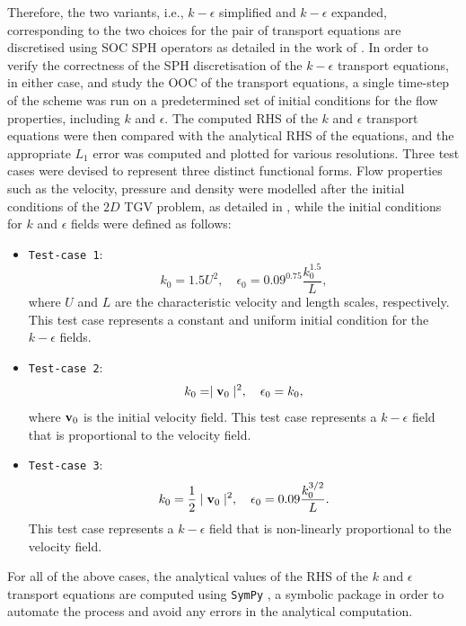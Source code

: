 Therefore, the two variants, i.e., $k-\epsilon$ simplified and $k-\epsilon$ expanded, corresponding to the two choices for the pair of transport equations are discretised using SOC SPH operators as detailed in the work of \cite{Negi2022Techniques}.
In order to verify the correctness of the SPH discretisation of the $k-\epsilon$ transport equations, in either case, and study the OOC of the transport equations, a single time-step of the scheme was run on a predetermined set of initial conditions for the flow properties, including $k$ and $\epsilon$. The computed RHS of the $k$ and $\epsilon$ transport equations were then compared with the analytical RHS of the equations, and the appropriate $L_1$ error was computed and plotted for various resolutions.
Three test cases were devised to represent three distinct functional forms. Flow properties such as the velocity, pressure and density were modelled after the initial conditions of the $2D$ TGV problem, as detailed in , while the initial conditions for $k$ and $\epsilon$ fields were defined as follows:
\begin{itemize}
  \item \texttt{Test-case 1}:
  \begin{equation}
    k_0 = 1.5 U^2, \quad \epsilon_0 = 0.09^{0.75} \frac{k_0^{1.5}}{L},
  \end{equation}
  where $U$ and $L$ are the characteristic velocity and length scales, respectively. This test case represents a constant and uniform initial condition for the $k-\epsilon$ fields.

  \item \texttt{Test-case 2}:
  \begin{equation}
    k_0 = \mid \mathbf{v}_0 \mid^2, \quad \epsilon_0 = k_0,
  \end{equation}
  where $\mathbf{v}_0$ is the initial velocity field. This test case represents a $k-\epsilon$ field that is proportional to the velocity field.

  \item \texttt{Test-case 3}:
  \begin{equation}
    k_0 = \frac{1}{2}\mid \mathbf{v}_0 \mid^2, \quad \epsilon_0 = 0.09 \frac{k_0^{3/2}}{L}.
  \end{equation}
  This test case represents a $k-\epsilon$ field that is non-linearly proportional to the velocity field.
\end{itemize}
For all of the above cases, the analytical values of the RHS of the $k$ and $\epsilon$ transport equations are computed using \texttt{SymPy} \parencite{Meurer2017}, a symbolic package in order to automate the process and avoid any errors in the analytical computation.

